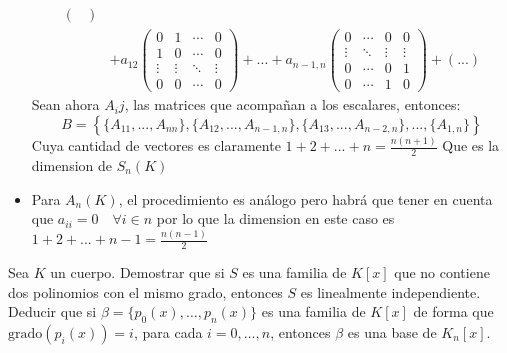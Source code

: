 \begin{ejercicio}
\begin{itemize}
\begin{align*}
\begin{pmatrix}
			                    \end{pmatrix}      \\
			               & + a_{12}\begin{pmatrix}
				                         0      & 1      & \cdots & 0      \\
				                         1      & 0      & \cdots & 0      \\
				                         \vdots & \vdots & \ddots & \vdots \\
				                         0      & 0      & \cdots & 0
			                         \end{pmatrix}
			      +...+ a_{n-1,n}\begin{pmatrix}
				                     0      & \cdots & 0      & 0      \\
				                     \vdots & \ddots & \vdots & \vdots \\
				                     0      & \cdots & 0      & 1      \\
				                     0      & \cdots & 1      & 0
			                     \end{pmatrix}+ (...)
		      \end{align*}
		      Sean ahora $A_ij$, las matrices que acompañan a los escalares, entonces:
		      \begin{equation*}
			      B=\left\{\{A_{11},...,A_{nn}\},\{A_{12},...,A_{n-1,n}\},\{A_{13},...,A_{n-2,n}\},...,\{A_{1,n}\}\right\}
		      \end{equation*}
		      Cuya cantidad de vectores es claramente $1+2+...+n= \frac{n(n+1)}{2}$ Que es la dimension de $S_{n}(K)$
		\item Para $A_n (K)$, el procedimiento es análogo pero habrá que tener en cuenta que $a_{ii}=0 \quad \forall i\in n$
		      por lo que la dimension en este caso es $1+2+...+n-1=\frac{n(n-1)}{2}$
	\end{itemize}
\end{ejercicio}


\begin{ejercicio} Sea \( K \) un cuerpo. Demostrar que si \( S \) es una familia de \( K[x] \) que no contiene dos polinomios con el mismo grado, entonces \( S \) es linealmente independiente. Deducir que si \( \beta = \{ p_0(x), \ldots, p_n(x) \} \) es una familia de \( K[x] \) de forma que \( \text{grado}(p_i(x)) = i \), para cada \( i = 0, \ldots, n \), entonces \( \beta \) es una base de \( K_n[x] \).
\end{ejercicio}


